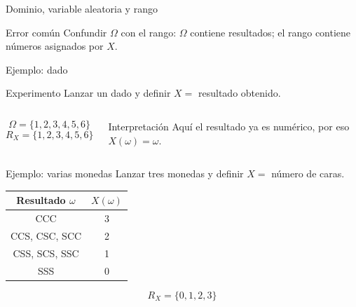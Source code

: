 \documentclass[aspectratio=169,11pt]{beamer}
\begin{document}
\begin{frame}{Dominio, variable aleatoria y rango}
\begin{center}
\end{center}
\begin{alertblock}{Error común}
Confundir $\Omega$ con el rango: $\Omega$ contiene resultados; el rango contiene números asignados por $X$.
\end{alertblock}
\end{frame}

\begin{frame}{Ejemplo: dado}
\begin{block}{Experimento}
Lanzar un dado y definir $X=$ resultado obtenido.
\end{block}
\begin{columns}[T]
\[
\Omega=\{1,2,3,4,5,6\}
\]
\[
R_X=\{1,2,3,4,5,6\}
\]
\begin{exampleblock}{Interpretación}
Aquí el resultado ya es numérico, por eso $X(\omega)=\omega$.
\end{exampleblock}
\end{columns}
\end{frame}

\begin{frame}{Ejemplo: varias monedas}
\small
Lanzar tres monedas y definir $X=$ número de caras.
\begin{center}
\begin{tabular}{c c}
\toprule
Resultado $\omega$ & $X(\omega)$ \\
\midrule
CCC & 3 \\
CCS, CSC, SCC & 2 \\
CSS, SCS, SSC & 1 \\
SSS & 0 \\
\bottomrule
\end{tabular}
\end{center}
\[
R_X=\{0,1,2,3\}
\]
\end{frame}
\end{document}
